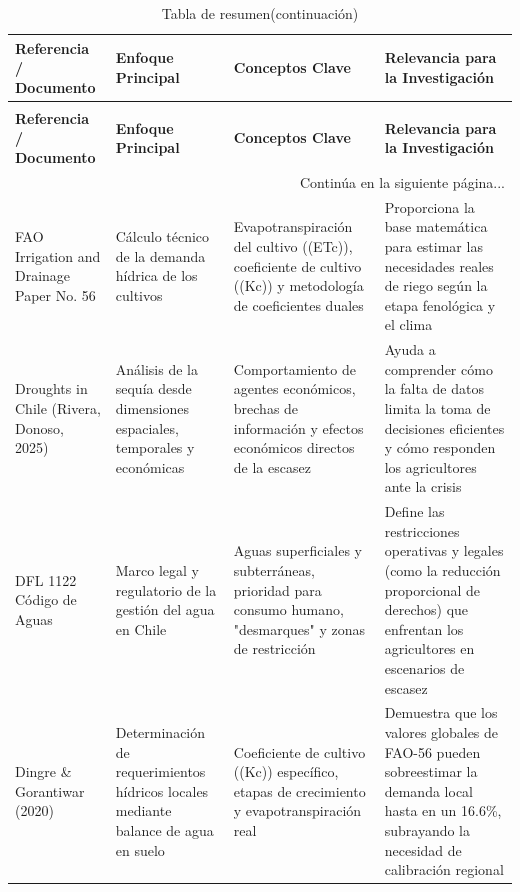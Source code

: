 \documentclass[12pt]{report}
\begin{document}
\small 
\begin{longtable}{p{3cm} p{3cm} p{5cm} p{4cm}}

\caption{Tabla resumen del Marco Teórico} \\
\hline
\textbf{Referencia / Documento} & \textbf{Enfoque Principal} & \textbf{Conceptos Clave} & \textbf{Relevancia para la Investigación}\\ \hline
\endfirsthead

\caption[]{Tabla de resumen(continuación)} \\
\hline
\textbf{Referencia / Documento} & \textbf{Enfoque Principal} & \textbf{Conceptos Clave} & \textbf{Relevancia para la Investigación}\\ \hline
\endhead

\hline
\multicolumn{4}{r}{{Continúa en la siguiente página...}} \\
\endfoot

\hline
\endlastfoot

FAO Irrigation and Drainage Paper No. 56 & Cálculo técnico de la demanda hídrica de los cultivos & Evapotranspiración del cultivo ((ETc)), coeficiente de cultivo ((Kc)) y metodología de coeficientes duales & Proporciona la base matemática para estimar las necesidades reales de riego según la etapa fenológica y el clima\\ \hline

Droughts in Chile (Rivera, Donoso, 2025) & Análisis de la sequía desde dimensiones espaciales, temporales y económicas & Comportamiento de agentes económicos, brechas de información y efectos económicos directos de la escasez & Ayuda a comprender cómo la falta de datos limita la toma de decisiones eficientes y cómo responden los agricultores ante la crisis\\ \hline

DFL 1122 Código de Aguas & Marco legal y regulatorio de la gestión del agua en Chile & Aguas superficiales y subterráneas, prioridad para consumo humano, "desmarques" y zonas de restricción & Define las restricciones operativas y legales (como la reducción proporcional de derechos) que enfrentan los agricultores en escenarios de escasez\\ \hline

Dingre \& Gorantiwar (2020) & Determinación de requerimientos hídricos locales mediante balance de agua en suelo & Coeficiente de cultivo ((Kc)) específico, etapas de crecimiento y evapotranspiración real & Demuestra que los valores globales de FAO-56 pueden sobreestimar la demanda local hasta en un 16.6\%, subrayando la necesidad de calibración regional\\ \hline


\end{longtable}
\end{document}
